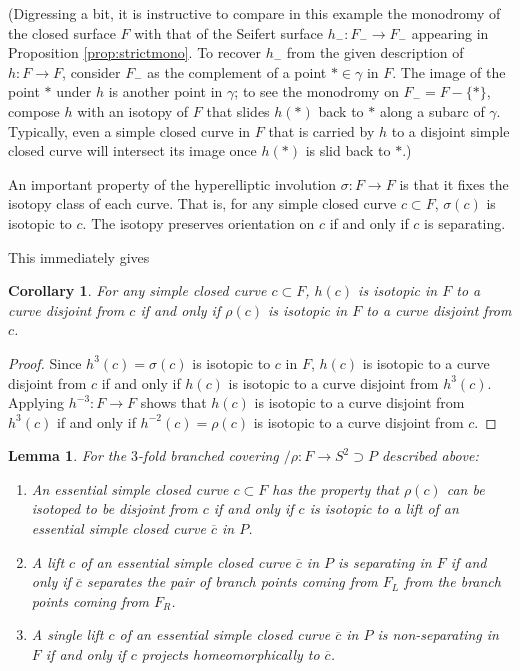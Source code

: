 \documentclass{amsart}
\newtheorem{cor}[thm]{Corollary}
\newtheorem{lemma}[thm]{Lemma}
\newcommand{\sss}{\mbox{$\sigma$}}
\begin{document}
(Digressing a bit, it is instructive to compare in this example the monodromy of the closed surface $F$ with that of the Seifert surface $h_-: F_- \to F_-$ appearing in Proposition \ref{prop:strictmono}.  To recover $h_-$ from the given description of $h: F \to F$, consider $F_-$ as the complement of a point $* \in \gamma$ in $F$.  The image of the point $*$ under $h$ is another point in $\gamma$; to see the monodromy on $F_- = F - \{*\}$, compose $h$ with an isotopy of $F$ that slides $h(*)$ back to $*$ along a subarc of $\gamma$.   Typically, even a simple closed curve in $F$ that is carried by $h$ to a disjoint simple closed curve will intersect its image once $h(*)$ is slid back to $*$.)

An important property of the hyperelliptic involution $\sss: F \to F$ is that it fixes the isotopy class of each curve.  That is, for any simple closed curve $c \subset F$, $\sss(c)$ is isotopic to $c$.  The isotopy preserves orientation on $c$ if and only if $c$ is separating.

This immediately gives
\begin{cor} For any simple closed curve $c \subset F$, $h(c)$ is isotopic in $F$ to a curve disjoint from $c$ if and only if $\rho(c)$ is isotopic in $F$ to a curve disjoint from $c$.
\end{cor}
\begin{proof}  Since $h^3(c) = \sss(c)$ is isotopic to $c$ in $F$, $h(c)$ is isotopic to a curve disjoint from $c$ if and only if $h(c)$ is isotopic to a curve disjoint from $h^3(c)$.  Applying $h^{-3}: F \to F$ shows that $h(c)$ is isotopic to a curve disjoint from $h^3(c)$ if and only if $h^{-2}(c) = \rho(c)$ is isotopic to a curve disjoint from $c$.
\end{proof}

  \begin{lemma} \label{lemma:overline}For the $3$-fold branched covering $/\rho: F \to S^2 \supset P$ described above: \begin{enumerate}
 \item An essential simple closed curve $c \subset F$ has the property that $\rho(c)$ can be isotoped to be disjoint from $c$ if and only if $c$ is isotopic to a lift of an essential simple closed curve $\overline{c}$ in $P$.

 \item  A lift $c$ of an essential simple closed curve $\overline{c}$ in $P$ is separating in $F$ if and only if $\overline{c}$ separates the pair of branch points coming from $F_L$ from the branch points coming from $F_R$.

 \item  A single lift $c$ of an essential simple closed curve $\overline{c}$ in $P$ is non-separating in $F$ if and only if $c$ projects homeomorphically to $\overline{c}$.
 \end{enumerate}
 \end{lemma}
\end{document}
